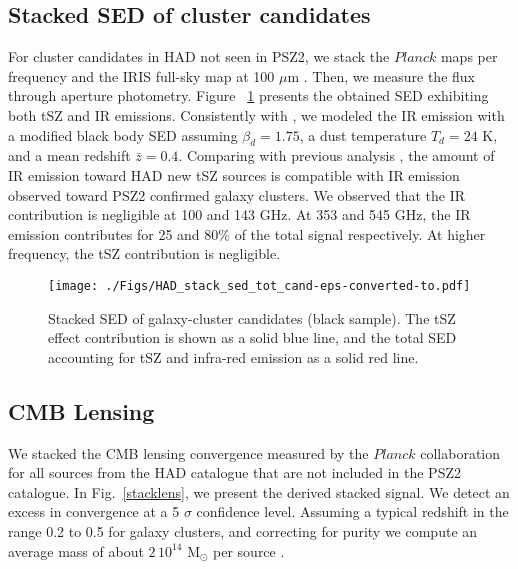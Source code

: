 \documentclass[traditabstract,a4,twocolumn]{aa}
\begin{document}
\subsection{Stacked SED of cluster candidates}

For cluster candidates in HAD not seen in PSZ2, we stack the $Planck$
maps per frequency and the IRIS full-sky map at 100 $\mu$m
\citep{miv05}. Then, we measure the flux through aperture photometry.
Figure ~\ref{stacksed} presents the obtained SED exhibiting both
tSZ and IR emissions. Consistently with \citet{planckszcib}, we modeled
the IR emission with a modified black body SED assuming
$\beta_d = 1.75$, a dust temperature $T_d = 24$ K, and a mean redshift
$\bar{z} = 0.4$. Comparing with previous analysis \citep{planckszcib},
the amount of IR emission toward HAD new tSZ sources is compatible with IR emission observed
toward PSZ2 confirmed galaxy clusters. We observed that the IR contribution is negligible at 100 and 143 GHz.
At 353 and 545 GHz, the IR emission contributes for 25 and 80\% of the total signal respectively.
At higher frequency, the tSZ contribution is negligible.

\begin{figure}[!th]
\begin{center}
\hspace{-1cm} \texttt{[image: ./Figs/HAD\_stack\_sed\_tot\_cand-eps-converted-to.pdf]}
\caption{Stacked SED of galaxy-cluster candidates (black sample). The
  tSZ effect contribution is shown as a solid blue line, and the total
  SED accounting for tSZ and infra-red emission as a solid red line.}
\label{stacksed}
\end{center}
\end{figure}


\subsection{CMB Lensing}

We stacked the CMB lensing convergence measured by the $Planck$ collaboration
\citep{plcklens} for all sources from the HAD catalogue that are not
included in the PSZ2 catalogue. In Fig.~\ref{stacklens},
we present the derived stacked signal.  We detect an excess in
convergence at a 5 $\sigma$ confidence level. Assuming a typical
redshift in the range 0.2 to 0.5 for galaxy clusters, and correcting
for purity we compute an average mass of about $2\, 10^{14}$ M$_\odot$
per source \citep[see e.g.,][for a detailed description of the
  convergence to mass conversion]{mel15}.
\end{document}
